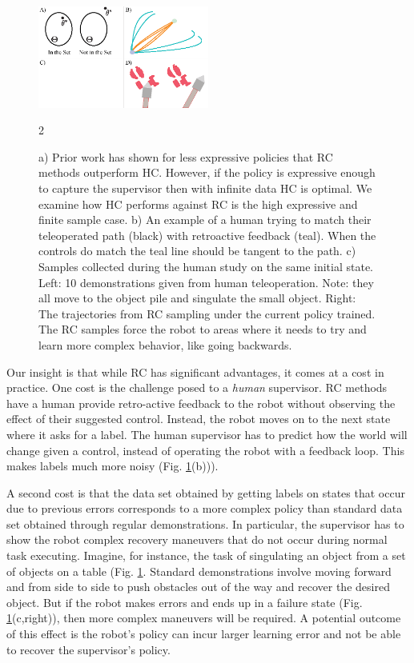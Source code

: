 \documentclass[10pt, conference]{ieeeconf}      %
\begin{document}
\begin{figure}
\center
\includegraphics[width=0.5\textwidth]{f_figs/teaser.eps}
\caption{
    \footnotesize
a) Prior work has shown for less expressive policies that RC methods outperform HC. However, if the policy is expressive enough to capture the supervisor then with infinite data HC is optimal. We examine how HC performs against RC is the high expressive and finite sample case.  b) An example of a human trying to match their teleoperated path (black) with retroactive feedback (teal). When the controls do match the teal line should be tangent to the path.  c) Samples collected during the human study on the same initial state. Left:  10 demonstrations given from human teleoperation. Note: they all move to the object pile and singulate the small object. Right: The trajectories from RC sampling under the current policy trained. The RC samples force the robot to areas where it needs to try and learn more complex behavior, like going backwards. }
\vspace*{-20pt}2
\label{fig:teaser}
\end{figure}


Our insight is that while RC has significant advantages, it comes at a cost in practice. One cost is the challenge posed to a \emph{human} supervisor.  RC methods have a human provide retro-active feedback to the robot without observing the effect of their suggested control. Instead, the robot moves on to the next state where it asks for a label.  The human supervisor has to predict how the world will change given a control, instead of operating the robot with a feedback loop. This makes labels much more noisy (Fig. \ref{fig:teaser}(b))).

A second cost is that the data set obtained by getting labels on states that occur due to previous errors corresponds to a more complex policy than standard data set obtained through regular demonstrations. In particular, the supervisor has to show the robot complex recovery maneuvers that do not occur during normal task executing. Imagine, for instance, the task of singulating an object from a set of objects on a table (Fig. \ref{fig:teaser}. Standard demonstrations involve moving forward and from side to side to push obstacles out of the way and recover the desired object. But if the robot makes errors and ends up in a failure state (Fig. \ref{fig:teaser}(c,right)), then more complex maneuvers will be required.  
A potential outcome of this effect is the robot's policy can incur larger learning error and not be able to recover the supervisor's policy. 
 
\end{document}
